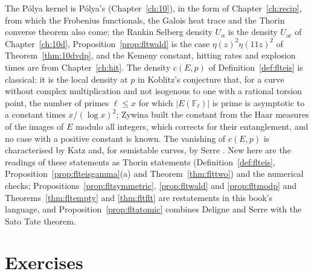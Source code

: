 The P\'olya kernel is P\'olya's (Chapter~\ref{ch:10}), in the form of Chapter~\ref{ch:recip}, from which the Frobenius functionals, the Galois heat trace and the Thorin converse theorem also come; the Rankin Selberg density $U_\alpha$ is the density $U_{\mathrm{ar}}$ of Chapter~\ref{ch:10d}, Proposition~\ref{prop:fltwald} is the case $\eta(z)^2\eta(11z)^2$ of Theorem~\ref{thm:10dvdp}, and the Kemeny constant, hitting rates and explosion times are from Chapter~\ref{ch:hit}. The density $c(E,p)$ of Definition~\ref{def:flteis} is classical: it is the local density at $p$ in Koblitz's conjecture \cite{koblitz1988} that, for a curve without complex multiplication and not isogenous to one with a rational torsion point, the number of primes $\ell\le x$ for which $|E(\mathbb F_\ell)|$ is prime is asymptotic to a constant times $x/(\log x)^2$; Zywina \cite{zywina2011} built the constant from the Haar measures of the images of $E$ modulo all integers, which corrects for their entanglement, and no case with a positive constant is known. The vanishing of $c(E,p)$ is characterised by Katz \cite{katz1981} and, for semistable curves, by Serre \cite{serre1972}. New here are the readings of these statements as Thorin statements (Definition~\ref{def:flteis}, Proposition~\ref{prop:flteisgamma}(a) and Theorem~\ref{thm:flttwo}) and the numerical checks; Propositions~\ref{prop:fltsymmetric}, \ref{prop:fltwald} and \ref{prop:fltmodp} and Theorems~\ref{thm:fltempty} and \ref{thm:fltflt} are restatements in this book's language, and Proposition~\ref{prop:fltatomic} combines Deligne and Serre with the Sato Tate theorem.

\section{Exercises}

